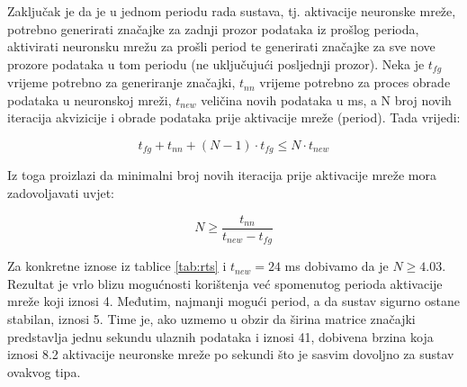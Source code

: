 Zaključak je da je u jednom periodu rada sustava, tj. aktivacije neuronske mreže, potrebno
generirati značajke za zadnji prozor podataka iz prošlog perioda, aktivirati neuronsku mrežu
za prošli period te generirati značajke za sve nove prozore podataka u tom periodu (ne uključujući
posljednji prozor).
Neka je $t_{fg}$ vrijeme potrebno za generiranje
značajki, $t_{nn}$ vrijeme potrebno za proces obrade podataka u neuronskoj mreži,
$t_{new}$ veličina novih podataka u ms, a N broj novih iteracija akvizicije i obrade podataka
prije aktivacije mreže (period). Tada vrijedi:

\begin{equation}
    t_{fg} + t_{nn} + (N - 1) \cdot t_{fg} \leq N \cdot t_{new}
\end{equation}

Iz toga proizlazi da minimalni broj novih iteracija prije aktivacije mreže mora zadovoljavati
uvjet:

\begin{equation}
    N \geq \frac{t_{nn}}{t_{new} - t_{fg}}
\end{equation}

Za konkretne iznose iz tablice \ref{tab:rts} i $t_{new} = 24$ ms dobivamo da je 
$N \geq 4.03$. Rezultat je vrlo blizu mogućnosti korištenja već spomenutog
perioda aktivacije mreže koji iznosi 4. Međutim, najmanji mogući period, a da sustav 
sigurno ostane stabilan, iznosi 5. Time je, ako uzmemo u obzir da širina matrice značajki 
predstavlja jednu sekundu ulaznih podataka i iznosi 41, dobivena brzina koja iznosi
8.2 aktivacije neuronske mreže po sekundi što je sasvim dovoljno za sustav ovakvog tipa.

